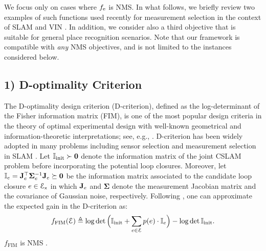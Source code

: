 \documentclass[conference]{IEEEtran}
\begin{document}
We focus only on cases where $f_\text{e}$ is NMS. 
In what follows, we briefly review two examples of such functions used recently for
measurement selection in the context of SLAM and VIN
\cite{kasra18ijrr,kasra16wafr,carlone2017attention}. In addition, we consider
also a third objective 
that is suitable
for general place recognition scenarios.
Note that our framework is compatible with \emph{any} NMS
objectives, and is not limited to the instances considered below.

\subsection*{1) D-optimality Criterion}
\label{subsec:FIM}
The D-optimality design criterion (D-criterion), defined as the log-determinant of
the Fisher information matrix (FIM), is one of the most popular design
criteria in the theory of optimal experimental design
with well-known geometrical and information-theoretic interpretations; see,
e.g., \cite{Joshi2009,Pukelsheim1993}.
D-criterion has been widely adopted in many
problems including sensor selection \cite{Joshi2009,shamaiah2010greedy} and
measurement selection in SLAM
\cite{carlone2017attention,kasra16wafr}. 
Let $\mathbb{I}_\text{init} \succ \mathbf{0}$ denote the information matrix of the joint CSLAM problem
before incorporating the potential loop closures. Moreover, let $\mathbb{I}_e = \mathbf{{J}}_e^\top
\boldsymbol\Sigma_e^{-1} \mathbf{{J}}_e
\succeq \mathbf{0}$ be
the information matrix associated to the candidate loop closure $e \in
\mathcal{E}_\mathsf{x}$ in which $\mathbf{{J}}_e$ and $\boldsymbol\Sigma$ denote the 
measurement Jacobian matrix and the covariance of Gaussian noise, respectively. Following \cite{carlone2017attention}, one can approximate the
expected gain in the D-criterion as:
\begin{equation}
  f_{\text{FIM}}(\mathcal{E}) \triangleq \log\det \Big(\mathbb{I}_\text{init} + \sum_{e \in \mathcal{E}}
  p(e) \cdot   \mathbb{I}_e\Big) - \log\det \mathbb{I}_\text{init}.
  \label{eq:FIM}
\end{equation}
$f_{\text{FIM}}$ is NMS \cite{shamaiah2010greedy,carlone2017attention}.
\end{document}
